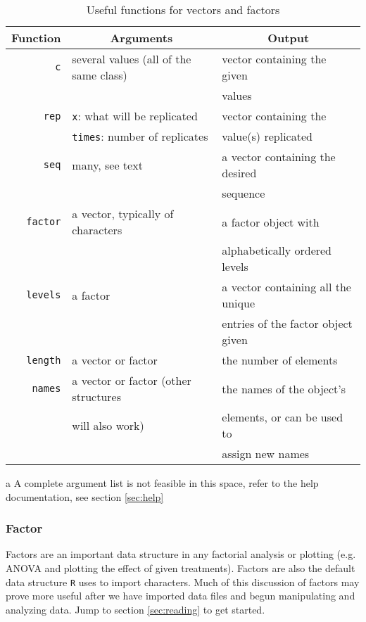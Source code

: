 \documentclass[12pt]{article}
\begin{document}
\begin{table}[!htb]
	\begin{threeparttable}
	\caption{Useful functions for vectors and factors}

	\begin{tabular}{r l l}
		\hline
		Function 	&	\multicolumn{1}{c}{Arguments\tnote{a}}		&	\multicolumn{1}{c}{Output}		\\
		\hline
		\verb+c+		&	several values (all of the same class)	&	vector containing the given		\\
					&									&	values						\\
		\verb+rep+	&	\verb+x+: what will be replicated		&	vector containing the 			\\
					&	\verb+times+: number of replicates		&	value(s) replicated				\\
		\verb+seq+	&	many, see text						&	a vector containing the desired		\\
					&									&	sequence						\\
		\verb+factor+	&	a vector, typically of characters			&	a factor object with 				\\
					&									&	alphabetically ordered levels		\\
		\verb+levels+	&	a factor							&	a vector containing all the unique	\\
					&									&	entries of the factor object given	\\
		\verb+length+	&	a vector or factor					&	the number of elements			\\
		\verb+names+	&	a vector or factor (other structures		&	the names of the object's			\\
					&	will also work)						&	elements, or can be used to		\\
					&									&	assign new names				\\
		\hline
	\end{tabular}
	\begin{tablenotes}
		\item[a] A complete argument list is not feasible in this space, refer to the help documentation, see section \ref{sec:help}
	\end{tablenotes}
	\end{threeparttable}
\end{table}


\subsubsection{Factor}
Factors are an important data structure in any factorial analysis or plotting (e.g. ANOVA and plotting the effect of given treatments).  Factors are also the default data structure \verb+R+ uses to import characters.  Much of this discussion of factors may prove more useful after we have imported data files and begun manipulating and analyzing data.  Jump to section \ref{sec:reading} to get started.
\end{document}
